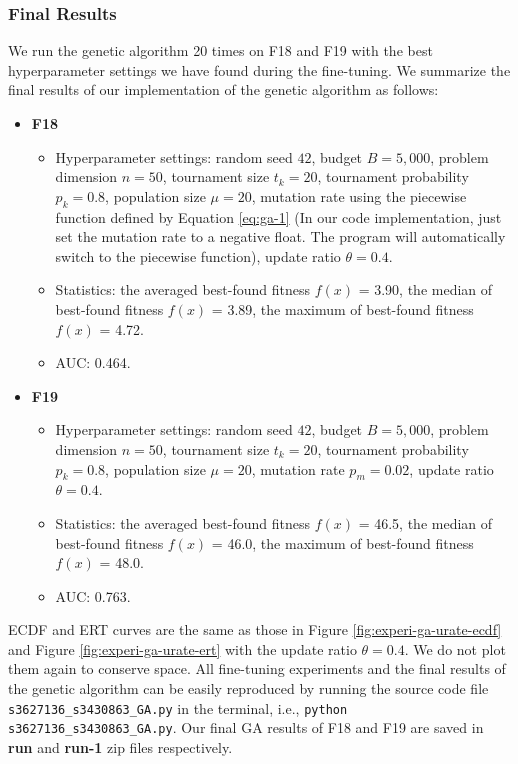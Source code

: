 \documentclass{article}
\begin{document}
\subsubsection{Final Results}
We run the genetic algorithm 20 times on F18 and F19 with the best hyperparameter settings we have found during the fine-tuning. We summarize the final results of our implementation of the genetic algorithm as follows:

\begin{itemize}
    \item \textbf{F18}
        \begin{itemize}
            \item Hyperparameter settings: random seed $42$, budget $B = 5,000$, problem dimension $n = 50$, tournament size $t_k = 20$, tournament probability $p_k = 0.8$, population size $\mu = 20$, mutation rate using the piecewise function defined by Equation \ref{eq:ga-1} (In our code implementation, just set the mutation rate to a negative float. The program will automatically switch to the piecewise function), update ratio $\theta = 0.4$.
            \item Statistics: the averaged best-found fitness $f(x)$ = 3.90, the median of best-found fitness $f(x)$ = 3.89, the maximum of best-found fitness $f(x)$ = 4.72.
            \item AUC: 0.464.
        \end{itemize}
    \item \textbf{F19}
        \begin{itemize}
            \item Hyperparameter settings: random seed $42$, budget $B = 5,000$, problem dimension $n = 50$, tournament size $t_k = 20$, tournament probability $p_k = 0.8$, population size $\mu = 20$, mutation rate $p_m = 0.02$, update ratio $\theta = 0.4$.
            \item Statistics: the averaged best-found fitness $f(x)$ = 46.5, the median of best-found fitness $f(x)$ = 46.0, the maximum of best-found fitness $f(x)$ = 48.0.
            \item AUC: 0.763.
        \end{itemize}
\end{itemize}

ECDF and ERT curves are the same as those in Figure \ref{fig:experi-ga-urate-ecdf} and Figure \ref{fig:experi-ga-urate-ert} with the update ratio $\theta = 0.4$. We do not plot them again to conserve space. All fine-tuning experiments and the final results of the genetic algorithm can be easily reproduced by running the source code file \texttt{s3627136\_s3430863\_GA.py} in the terminal, i.e., \texttt{python s3627136\_s3430863\_GA.py}. Our final GA results of F18 and F19 are saved in \textbf{run} and \textbf{run-1} zip files respectively.
\end{document}
